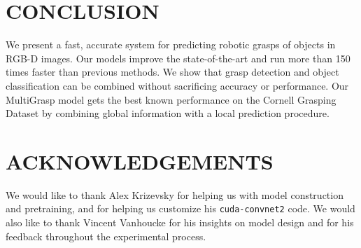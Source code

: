 \documentclass[letterpaper, 10 pt, conference]{ieeeconf}
\begin{document}
\section{CONCLUSION}

We present a fast, accurate system for predicting robotic grasps of objects in RGB-D images. Our models improve the state-of-the-art and run more than 150 times faster than previous methods. We show that grasp detection and object classification can be combined without sacrificing accuracy or performance. Our MultiGrasp model gets the best known performance on the Cornell Grasping Dataset by combining global information with a local prediction procedure.


\section{ACKNOWLEDGEMENTS}

We would like to thank Alex Krizevsky for helping us with model construction and pretraining, and for helping us customize his \texttt{cuda-convnet2} code. We would also like to thank Vincent Vanhoucke for his insights on model design and for his feedback throughout the experimental process.



\end{document}
